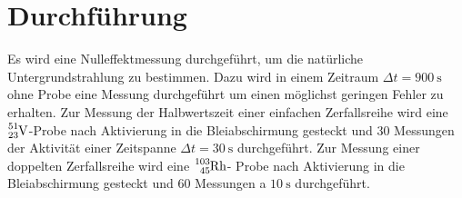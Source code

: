 \section{Durchführung}
\label{sec:Durchführung}

Es wird eine Nulleffektmessung durchgeführt, um die natürliche Untergrundstrahlung zu bestimmen. Dazu wird in einem Zeitraum $\Delta t= \SI{900}{\second}$ ohne Probe eine Messung durchgeführt um einen möglichst geringen Fehler zu erhalten.
Zur Messung der Halbwertszeit einer einfachen Zerfallsreihe wird eine $\ce{^{51}_{23}V}$-Probe nach Aktivierung in die Bleiabschirmung gesteckt und $30$ Messungen der Aktivität einer Zeitspanne $\Delta t= \SI{30}{\second}$ durchgeführt.
Zur Messung einer doppelten Zerfallsreihe wird eine $\ce{^{103}_{45}Rh}$- Probe nach Aktivierung in die Bleiabschirmung gesteckt und $60$ Messungen a $\SI{10}{\second}$
durchgeführt.